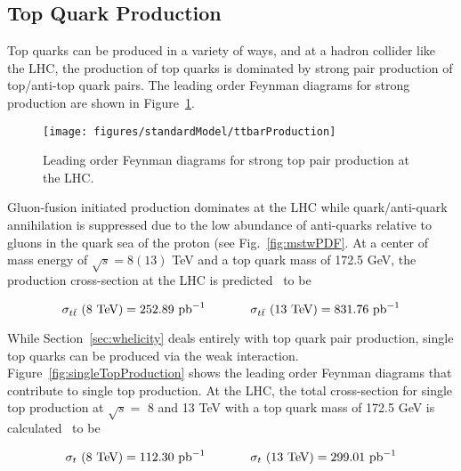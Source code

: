 \subsection{Top Quark Production}
Top quarks can be produced in a variety of ways, and at a hadron collider like the LHC, the production of top quarks is dominated by strong pair production of top/anti-top quark pairs. The leading order Feynman diagrams for strong \ttbar production are shown in Figure~\ref{fig:ttbarProduction}. 
\begin{figure}[h!]
\centering
\label{fig:ttbarProduction}
\texttt{[image: figures/standardModel/ttbarProduction]}
\caption{Leading order Feynman diagrams for strong top pair production at the LHC.}
\end{figure}
Gluon-fusion initiated production dominates at the LHC while quark/anti-quark annihilation is suppressed due to the low abundance of anti-quarks relative to gluons in the quark sea of the proton (see Fig.~\ref{fig:mstwPDF}. At a center of mass energy of $\sqrt{s} = 8 (13)$ TeV and a top quark mass of 172.5 GeV, the \ttbar production cross-section at the LHC is predicted~\cite{Czakon:2011xx} to be

\begin{equation*}
\sigma_{t\bar{t}}\text{ (8 TeV)} = 252.89 \text{ pb}^{-1}\hspace{.5in}  \sigma_{t\bar{t}}\text{ (13 TeV)} = 831.76 \text{ pb}^{-1}
\end{equation*}


While Section~\ref{sec:whelicity} deals entirely with top quark pair production, single top quarks can be produced via the weak interaction. Figure~\ref{fig:singleTopProduction} shows the leading order Feynman diagrams that contribute to single top production. At the LHC, the total cross-section for single top production at $\sqrt{s}=$ 8 and 13 TeV with a top quark mass of 172.5 GeV is calculated~\cite{Kant:2014oha} to be

\begin{equation*}
\sigma_{t}\text{ (8 TeV)} = 112.30 \text{ pb}^{-1}\hspace{.5in}  \sigma_{t}\text{ (13 TeV)} = 299.01 \text{ pb}^{-1}
\end{equation*}

